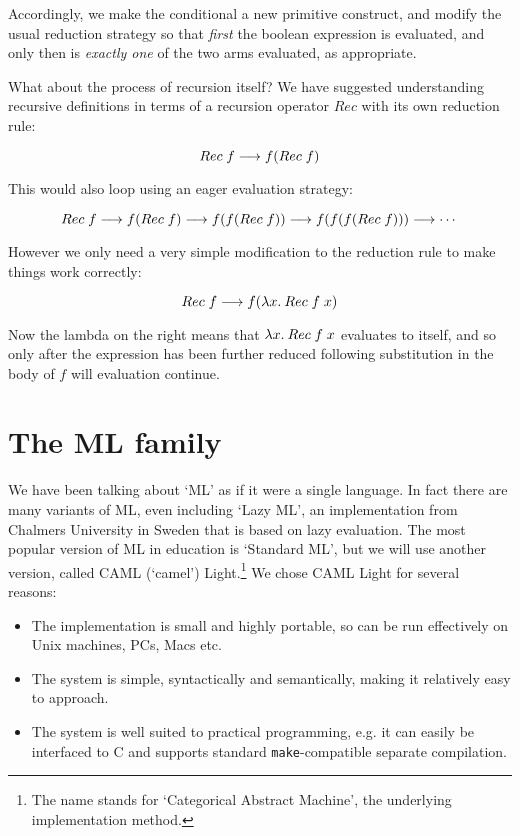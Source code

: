 Accordingly, we make the conditional a new primitive construct, and modify the
usual reduction strategy so that {\em first} the boolean expression is
evaluated, and only then is {\em exactly one} of the two arms evaluated, as
appropriate.

What about the process of recursion itself? We have suggested understanding
recursive definitions in terms of a recursion operator $Rec$ with its own
reduction rule:

$$ Rec\; f \longrightarrow f(Rec\; f) $$

\noindent This would also loop using an eager evaluation strategy:

$$  Rec\; f \longrightarrow f(Rec\; f) \longrightarrow f(f(Rec\; f)) \longrightarrow f(f(f(Rec\; f)))
\longrightarrow \cdots $$

However we only need a very simple modification to the reduction rule to make
things work correctly:

$$ Rec\; f \longrightarrow f(\lambda x.\: Rec\; f\; x) $$

Now the lambda on the right means that $\lambda x.\: Rec\; f\; x$ evaluates to
itself, and so only after the expression has been further reduced following
substitution in the body of $f$ will evaluation continue.

\section{The ML family}

We have been talking about `ML' as if it were a single language. In fact there
are many variants of ML, even including `Lazy ML', an implementation from
Chalmers University in Sweden that is based on lazy evaluation. The most
popular version of ML in education is `Standard ML', but we will use another
version, called CAML (`camel') Light.\footnote{The name stands for `Categorical
Abstract Machine', the underlying implementation method.} We chose CAML Light
for several reasons:

\begin{itemize}

\item The implementation is small and highly portable, so can be run
effectively on Unix machines, PCs, Macs etc.

\item The system is simple, syntactically and semantically, making it
relatively easy to approach.

\item The system is well suited to practical programming, e.g. it can easily be
interfaced to C and supports standard {\tt make}-compatible separate
compilation.

\end{itemize}

